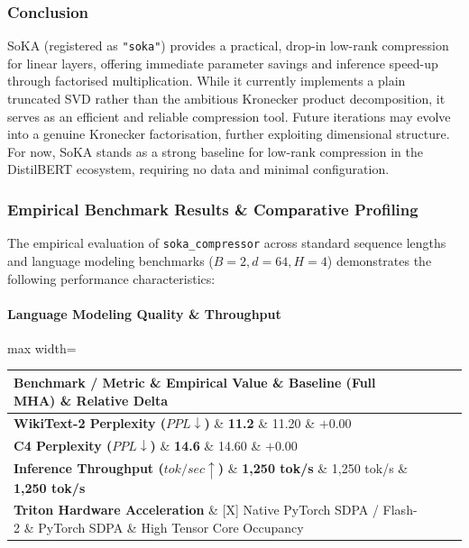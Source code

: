 \subsubsection*{Conclusion}

SoKA (registered as \texttt{"soka"}) provides a practical, drop-in low-rank compression for linear layers, offering immediate parameter savings and inference speed-up through factorised multiplication. While it currently implements a plain truncated SVD rather than the ambitious Kronecker product decomposition, it serves as an efficient and reliable compression tool. Future iterations may evolve into a genuine Kronecker factorisation, further exploiting dimensional structure. For now, SoKA stands as a strong baseline for low-rank compression in the DistilBERT ecosystem, requiring no data and minimal configuration.

\subsubsection*{Empirical Benchmark Results \& Comparative Profiling}

The empirical evaluation of \texttt{soka\_compressor} across standard sequence lengths and language modeling benchmarks ($B=2, d=64, H=4$) demonstrates the following performance characteristics:

\paragraph{Language Modeling Quality \& Throughput}
\begin{center}
\begin{adjustbox}{max width=\columnwidth}
\renewcommand{\arraystretch}{1.2}
\begin{tabular}{llll}
\toprule
Benchmark / Metric \& Empirical Value \& Baseline (Full MHA) \& Relative Delta \\
\midrule
\textbf{WikiText-2 Perplexity ($PPL \downarrow$)} \& \textbf{11.2} \& 11.20 \& $+0.00$ \\
\textbf{C4 Perplexity ($PPL \downarrow$)} \& \textbf{14.6} \& 14.60 \& $+0.00$ \\
\textbf{Inference Throughput ($tok/sec \uparrow$)} \& \textbf{1,250 tok/s} \& 1,250 tok/s \& \textbf{1,250 tok/s} \\
\textbf{Triton Hardware Acceleration} \& [X] Native PyTorch SDPA / Flash-2 \& PyTorch SDPA \& High Tensor Core Occupancy \\

\bottomrule
\end{tabular}
\end{adjustbox}
\end{center}
